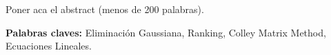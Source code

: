 \section*{\runtitulo}

\noindent Poner aca el abstract (menos de 200 palabras).

\bigskip

\noindent\textbf{Palabras claves:} Eliminación Gaussiana, Ranking, Colley Matrix Method, Ecuaciones Lineales.
